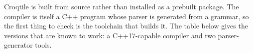 Croqtile is built from source rather than installed as a prebuilt package. The compiler is itself a C++ program whose parser is generated from a grammar, so the first thing to check is the toolchain that builds it. The table below gives the versions that are known to work: a C++17-capable compiler and two parser-generator tools.
